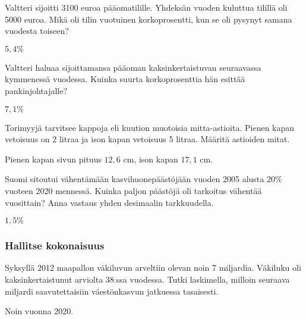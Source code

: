 \begin{tehtavasivu}
\begin{tehtava}%
Valtteri sijoitti 3100 euroa pääomatilille. Yhdeksän vuoden kuluttua tilillä oli 5000 euroa. Mikä oli tilin vuotuinen korkoprosentti, kun se oli pysynyt samana vuodesta toiseen? 
\begin{vastaus}
$5,4\%$
\end{vastaus}
\end{tehtava}
\begin{tehtava}%
Valtteri haluaa sijoittamansa pääoman kaksinkertaistuvan seuraavassa kymmenessä vuodessa. Kuinka suurta korkoprosenttia hän esittää pankinjohtajalle?
\begin{vastaus}
$7,1\%$
\end{vastaus}
\end{tehtava}


\begin{tehtava}%
Torimyyjä tarvitsee kappoja eli kuution muotoisia mitta-astioita. Pienen kapan vetoisuus on 2 litraa ja ison kapan vetoisuus 5 litraa. Määritä astioiden mitat.
\begin{vastaus}
Pienen kapan sivun pituus $12,6$ cm, ison kapan $17,1$ cm. 
\end{vastaus}
\end{tehtava}

\begin{tehtava}%
Suomi sitoutui vähentämään kasvihuonepäästöjään vuoden 2005 alusta $20\%$ vuoteen 2020 mennessä. Kuinka paljon päästöjä oli tarkoitus vähentää vuosittain? Anna vastaus yhden desimaalin tarkkuudella.
\begin{vastaus}
$1,5\%$
\end{vastaus}
\end{tehtava}

\subsubsection*{Hallitse kokonaisuus}
\begin{tehtava}%
Syksyllä 2012 maapallon väkiluvun arveltiin olevan noin 7 miljardia. Väkiluku oli kaksinkertaistunut arviolta 38:ssa vuodessa. Tutki laskimella, milloin seuraava miljardi saavutettaisiin väestönkasvun jatkuessa tasaisesti.
\begin{vastaus}
Noin vuonna 2020.
\end{vastaus}
\end{tehtava}



\end{tehtavasivu}
